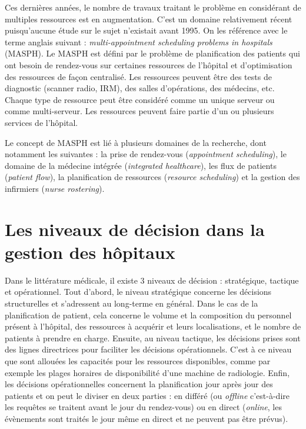 \documentclass{polytech/polytech}
\begin{document}
Ces dernières années, le nombre de travaux traitant le problème en considérant de multiples ressources est en augmentation. C'est un domaine relativement récent puisqu'aucune étude sur le sujet n'existait avant 1995. On les référence avec le terme anglais suivant : \textit{multi-appointment scheduling problems in hospitals} (MASPH). Le MASPH est défini par le problème de planification des patients qui ont besoin de rendez-vous sur certaines ressources de l'hôpital et d'optimisation des ressources de façon centralisé. Les ressources peuvent être des tests de diagnostic (scanner radio, IRM), des salles d'opérations, des médecins, etc. Chaque type de ressource peut être considéré comme un unique serveur ou comme multi-serveur. Les ressources peuvent faire partie d'un ou plusieurs services de l'hôpital. 

Le concept de MASPH est lié à plusieurs domaines de la recherche, dont notamment les suivantes : la prise de rendez-vous (\textit{appointment scheduling}), le domaine de la médecine intégrée (\textit{integrated healthcare}), les flux de patients (\textit{patient flow}), la planification de ressources (\textit{resource scheduling}) et la gestion des infirmiers (\textit{nurse rostering}). 


\section{Les niveaux de décision dans la gestion des hôpitaux}

Dans le littérature médicale, il existe 3 niveaux de décision : stratégique, tactique et opérationnel. Tout d'abord, le niveau stratégique concerne les décisions structurelles et s'adressent au long-terme en général. Dans le cas de la planification de patient, cela concerne le volume et la composition du personnel présent à l'hôpital, des ressources à acquérir et leurs localisations, et le nombre de patients à prendre en charge. Ensuite, au niveau tactique, les décisions prises sont des lignes directrices pour faciliter les décisions opérationnels. C'est à ce niveau que sont allouées les capacités pour les ressources disponibles, comme par exemple les plages horaires de disponibilité d'une machine de radiologie. Enfin, les décisions opérationnelles concernent la planification jour après jour des patients et on peut le diviser en deux parties : en différé (ou \textit{offline} c'est-à-dire les requêtes se traitent avant le jour du rendez-vous) ou en direct (\textit{online}, les évènements sont traités le jour même en direct et ne peuvent pas être prévus). 
\end{document}
